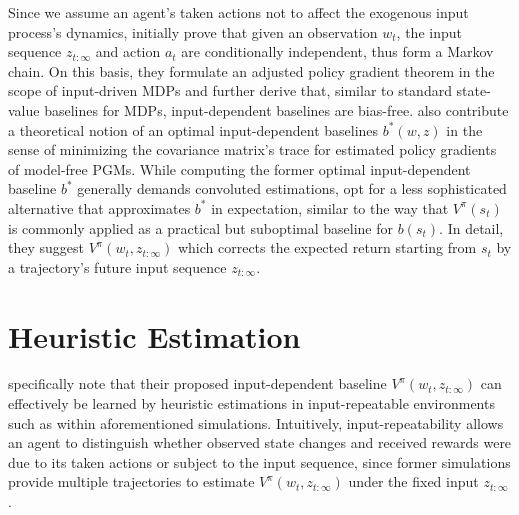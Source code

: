 
Since we assume an agent's taken actions not to affect the exogenous input process's dynamics, \citeauthor{mao2018variance} initially prove that given an observation $w_t$, the input sequence $z_{t:\infty}$ and action $a_t$ are conditionally independent, thus form a Markov chain. On this basis, they formulate an adjusted policy gradient theorem in the scope of input-driven MDPs and further derive that, similar to standard state-value baselines for MDPs, input-dependent baselines are bias-free. \citeauthor{mao2018variance} also contribute a theoretical notion of an optimal input-dependent baselines $b^*(w,z)$ in the sense of minimizing the covariance matrix's trace for estimated policy gradients of model-free PGMs. While computing the former optimal input-dependent baseline $b^*$ generally demands convoluted estimations, \citeauthor{mao2018variance} opt for a less sophisticated alternative that approximates $b^*$ in expectation, similar to the way that $V^{\pi}(s_t)$ is commonly applied as a practical but suboptimal baseline for $b(s_t)$. In detail, they suggest $V^{\pi}(w_t,z_{t:\infty})$ which corrects the expected return starting from $s_t$ by a trajectory's future input sequence $z_{t:\infty}$.

\section{Heuristic Estimation}

\citeauthor{mao2018variance} specifically note that their proposed input-dependent baseline $V^{\pi}(w_t,z_{t:\infty})$ can effectively be learned by heuristic estimations in input-repeatable environments such as within aforementioned simulations. Intuitively, input-repeatability allows an agent to distinguish whether observed state changes and received rewards were due to its taken actions or subject to the input sequence, since former simulations provide multiple trajectories to estimate $V^{\pi}(w_t,z_{t:\infty})$ under the fixed input $z_{t:\infty}$.

